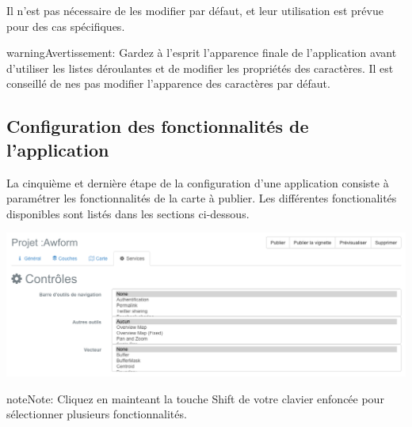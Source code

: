 \documentclass[letterpaper,10pt,french]{sphinxmanual}
\begin{document}
Il n'est pas nécessaire de les modifier par défaut, et leur utilisation est prévue pour des cas spécifiques.

\begin{notice}{warning}{Avertissement:}
Gardez à l'esprit l'apparence finale de l'application avant
d'utiliser les listes déroulantes et de modifier les
propriétés des caractères. Il est conseillé de nes pas
modifier l'apparence des caractères par défaut.
\end{notice}


\subsection{Configuration des fonctionnalités de l'application}
\label{apps/appconfig:configuration-des-fonctionnalites-de-l-application}
La cinquième et dernière étape de la configuration d’une application consiste à paramétrer les fonctionnalités de la carte à publier. Les différentes fonctionalités disponibles sont listés dans les sections ci-dessous.

\includegraphics[width=1.000\linewidth]{publisher-controls-conf.png}

\begin{notice}{note}{Note:}
Cliquez en mainteant la touche Shift de votre clavier enfoncée pour sélectionner plusieurs fonctionnalités.
\end{notice}
\end{document}

